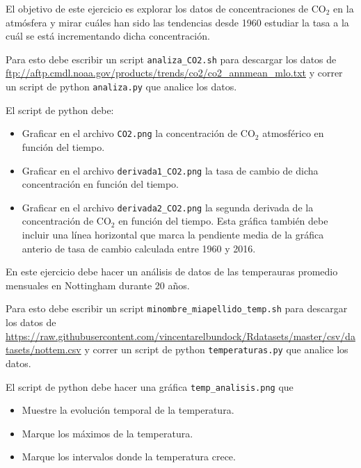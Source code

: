 \documentclass[11pt,letterpaper]{exam}
\begin{document}
\begin{questions}


El objetivo de este ejercicio es explorar los datos de concentraciones
de CO$_2$ en la atmósfera y mirar cuáles han sido las tendencias desde
1960 estudiar la tasa a la cuál se está incrementando dicha
concentración. 

Para esto debe escribir un script \verb"analiza_CO2.sh" para descargar los datos de
\url{ftp://aftp.cmdl.noaa.gov/products/trends/co2/co2_annmean_mlo.txt}
y correr un script de python \verb"analiza.py" que analice los datos.

El script de python debe: 

\begin{itemize}
\item Graficar en el archivo \verb"CO2.png" la concentración de CO$_2$
  atmosférico en función del tiempo.
\item Graficar en el archivo \verb"derivada1_CO2.png" la tasa de
  cambio de dicha concentración en función del tiempo. 
\item Graficar en el archivo \verb"derivada2_CO2.png" la segunda
  derivada de la concentraci\'on de CO$_2$ en funci\'on del tiempo.
  Esta gr\'afica tambi\'en debe incluir una l\'inea horizontal que
  marca la pendiente media de la gr\'afica anterio de tasa de cambio
  calculada entre 1960 y 2016.
\end{itemize}


En este ejercicio debe hacer un análisis de datos de las temperauras
promedio mensuales en Nottingham durante 20 años. 

Para esto debe escribir un script \verb"minombre_miapellido_temp.sh"
para descargar los datos de
\url{https://raw.githubusercontent.com/vincentarelbundock/Rdatasets/master/csv/datasets/nottem.csv}
y correr un script de python \verb"temperaturas.py" que analice los datos. 

El script de python debe hacer una gr\'afica \verb"temp_analisis.png"
que 

\begin{itemize}
\item Muestre la evoluci\'on temporal de la temperatura. 
\item Marque los m\'aximos de la temperatura.
\item Marque los intervalos donde la temperatura crece.
\end{itemize}



\end{questions}
\end{document}
